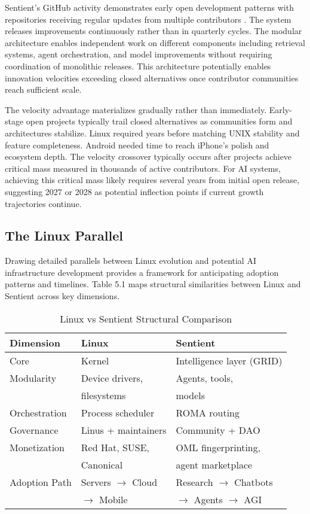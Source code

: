Sentient's GitHub activity demonstrates early open development patterns with repositories receiving regular updates from multiple contributors \cite{ods_github2025, roma_github2025}. The system releases improvements continuously rather than in quarterly cycles. The modular architecture enables independent work on different components including retrieval systems, agent orchestration, and model improvements without requiring coordination of monolithic releases. This architecture potentially enables innovation velocities exceeding closed alternatives once contributor communities reach sufficient scale.

The velocity advantage materializes gradually rather than immediately. Early-stage open projects typically trail closed alternatives as communities form and architectures stabilize. Linux required years before matching UNIX stability and feature completeness. Android needed time to reach iPhone's polish and ecosystem depth. The velocity crossover typically occurs after projects achieve critical mass measured in thousands of active contributors. For AI systems, achieving this critical mass likely requires several years from initial open release, suggesting 2027 or 2028 as potential inflection points if current growth trajectories continue.

\subsection{The Linux Parallel}

Drawing detailed parallels between Linux evolution and potential AI infrastructure development provides a framework for anticipating adoption patterns and timelines. Table 5.1 maps structural similarities between Linux and Sentient across key dimensions.

\begin{table}[h]
\centering
\caption{Linux vs Sentient Structural Comparison}
\begin{tabular}{lll}
\toprule
\textbf{Dimension} & \textbf{Linux} & \textbf{Sentient} \\
\midrule
Core & Kernel & Intelligence layer (GRID) \\
Modularity & Device drivers, & Agents, tools, \\
           & filesystems & models \\
Orchestration & Process scheduler & ROMA routing \\
Governance & Linus + maintainers & Community + DAO \\
Monetization & Red Hat, SUSE, & OML fingerprinting, \\
             & Canonical & agent marketplace \\
Adoption Path & Servers $\rightarrow$ Cloud & Research $\rightarrow$ Chatbots \\
              & $\rightarrow$ Mobile & $\rightarrow$ Agents $\rightarrow$ AGI \\
\bottomrule
\end{tabular}
\label{tab:linux_sentient_comparison}
\end{table}

